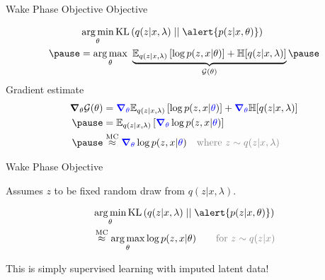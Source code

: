 \begin{frame}{Wake Phase Objective}
Objective  %

\vspace{-15pt}

\begin{equation*}
\begin{aligned}
&\argmin_{\theta} \KL{q(z|x, \lambda)}{\alert{p(z|x, \theta)}} \\ \pause
&= \argmax_{\theta}~ \underbrace{\mathbb E_{q(z|x, \lambda)}\left[ \log p(z, x| \theta) \right] + \mathbb H[q(z|x, \lambda)]}_{\mathcal G(\theta)}  \pause
\end{aligned}
\end{equation*}
\vspace{-2pt}
Gradient estimate
\begin{equation*}
\begin{aligned}
\grad_\theta \mathcal G(\theta) &= \textcolor{blue}{\grad_\theta}  \mathbb E_{q(z|x, {\lambda})}\left[ \log p(z, x| \textcolor{blue}{\theta}) \right] + \textcolor{blue}{\grad_\theta} \mathbb H[q(z|x, {\lambda})] \\ \pause 
&=\mathbb E_{q(z|x, {\lambda})}\left[ \textcolor{blue}{\grad_\theta} \log p(z, x| \textcolor{blue}{\theta}) \right] \\ \pause
&\overset{\text{MC}}{\approx} \textcolor{blue}{\grad_\theta} \log p(z, x| \textcolor{blue}{\theta}) \quad \textcolor{gray}{\text{where } z \sim q(z|x, \lambda)}
\end{aligned}
\end{equation*} 
 
\end{frame}

\begin{frame}{Wake Phase Objective}

Assumes  $ z $ to be fixed random draw from $ q(z|x,\lambda) $.

\begin{equation*}
\begin{aligned}
&\argmin_{\theta} \KL{q(z|x, \lambda)}{\alert{p(z|x, \theta)}} \\ 
&\overset{\text{MC}}{\approx} \argmax_\theta \log p(z, x| \theta) \quad\quad \textcolor{gray}{\text{for }z \sim q(z|x)}
\end{aligned}
\end{equation*} 

This is simply supervised learning with imputed latent data!

\end{frame}


